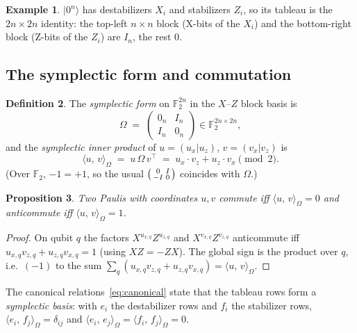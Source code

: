 \documentclass[11pt]{article}
\theoremstyle{definition}
\newtheorem{definition}{Definition}[section]
\newtheorem{example}[definition]{Example}
\theoremstyle{plain}
\newtheorem{proposition}[definition]{Proposition}
\newcommand{\F}{\mathbb{F}}
\newcommand{\sympprod}[2]{\langle #1,\, #2\rangle_{\Omega}}
\newcommand{\ket}[1]{\lvert #1\rangle}
\begin{document}
\begin{example}
$\ket{0^n}$ has destabilizers $X_i$ and stabilizers $Z_i$, so its tableau is the
$2n\times 2n$ identity: the top-left $n\times n$ block (X-bits of the $X_i$) and
the bottom-right block (Z-bits of the $Z_i$) are $I_n$, the rest $0$.
\end{example}

\subsection{The symplectic form and commutation}
\begin{definition}
The \emph{symplectic form} on $\F_2^{2n}$ in the $X$--$Z$ block basis is
\begin{equation}
  \Omega \;=\; \begin{pmatrix} 0_n & I_n\\ I_n & 0_n \end{pmatrix}
  \in \F_2^{2n\times 2n},
\end{equation}
and the \emph{symplectic inner product} of $u=(u_x|u_z)$, $v=(v_x|v_z)$ is
\begin{equation}
\label{eq:sympprod}
  \sympprod{u}{v} \;=\; u\,\Omega\,v^{\!\top}
  \;=\; u_x\!\cdot\! v_z + u_z\!\cdot\! v_x \pmod 2 .
\end{equation}
(Over $\F_2$, $-1=+1$, so the usual $\begin{psmallmatrix}0&I\\-I&0\end{psmallmatrix}$
coincides with $\Omega$.)
\end{definition}
\begin{proposition}
Two Paulis with coordinates $u,v$ commute iff $\sympprod{u}{v}=0$ and
anticommute iff $\sympprod{u}{v}=1$.
\end{proposition}
\begin{proof}
On qubit $q$ the factors $X^{u_{x,q}}Z^{u_{z,q}}$ and $X^{v_{x,q}}Z^{v_{z,q}}$
anticommute iff $u_{x,q}v_{z,q}+u_{z,q}v_{x,q}=1$ (using $XZ=-ZX$). The global
sign is the product over $q$, i.e.\ $(-1)$ to the sum
$\sum_q(u_{x,q}v_{z,q}+u_{z,q}v_{x,q})=\sympprod{u}{v}$.
\end{proof}
The canonical relations~\eqref{eq:canonical} state that the tableau rows form a
\emph{symplectic basis}: with $e_i$ the destabilizer rows and $f_i$ the
stabilizer rows, $\sympprod{e_i}{f_j}=\delta_{ij}$ and
$\sympprod{e_i}{e_j}=\sympprod{f_i}{f_j}=0$.
\end{document}
